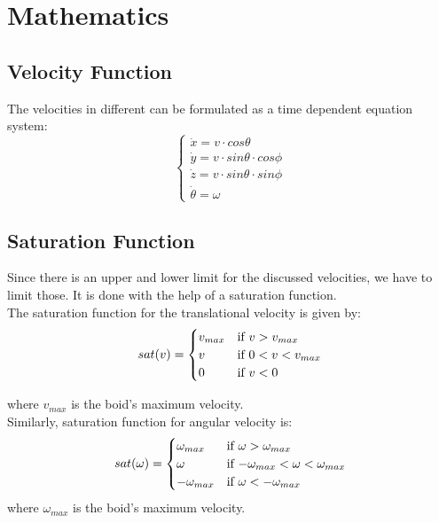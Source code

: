 \documentclass{article}
\begin{document}
\section{Mathematics}

\subsection{Velocity Function}
The velocities in different can be formulated as a time dependent equation system:\\
\begin{equation}
    \begin{cases}
    \Dot{x} = v \cdot cos\theta \\
    \Dot{y} = v \cdot sin\theta \cdot cos \phi\\
    \Dot{z} = v \cdot sin\theta \cdot sin \phi\\
    \Dot{\theta} = \omega
    \end{cases}
\end{equation}

\subsection{Saturation Function}
Since there is an upper and lower limit for the discussed velocities, we have to limit those. It is done with the help of a saturation function.\\
The saturation function for the translational velocity is given by:\\
\begin{equation}
    sat(v)=\begin{cases}
    v_{max}  & $\text{if $v>v_{max}$}$\\
    v  & $\text{if $0<v<v_{max}$}$\\
    0  & $\text{if $v<0$}$
    \end{cases}
\end{equation}

where $v_{max}$ is the boid's maximum velocity.\\

Similarly, saturation function for angular velocity is:\\
\begin{equation}
    sat(\omega)=\begin{cases}
    \omega _{max}  & $\text{if $\omega>\omega _{max}$}$\\
    \omega  & $\text{if $-\omega _{max}<\omega<\omega _{max}$}$\\
    -\omega _{max}  & $\text{if $\omega<-\omega _{max}$}$
    \end{cases}
\end{equation}
where $\omega _{max}$ is the boid's maximum velocity.\\
\end{document}
